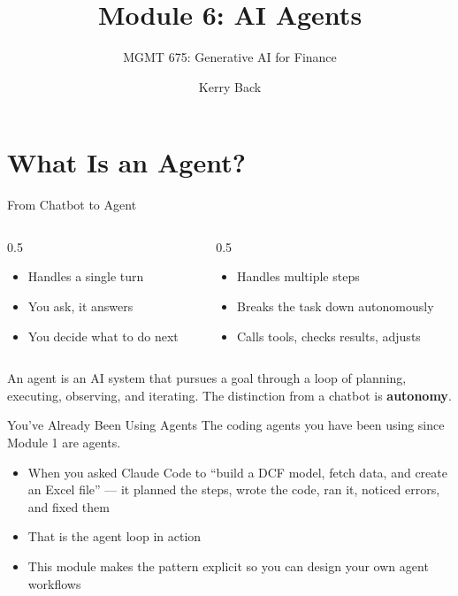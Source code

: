 \documentclass[aspectratio=169]{beamer}
\subtitle{MGMT 675: Generative AI for Finance}
\title{Module 6: AI Agents}
\author{Kerry Back}
\date{}
\begin{document}
\maketitle

\section{What Is an Agent?}

\begin{frame}{From Chatbot to Agent}
\begin{columns}[T]
\begin{column}{0.5\textwidth}
\begin{shadedbox}[title=\textbf{Chatbot}]
\begin{itemize}\small
  \item Handles a single turn
  \item You ask, it answers
  \item \alert{You} decide what to do next
\end{itemize}
\end{shadedbox}
\end{column}
\begin{column}{0.5\textwidth}
\begin{shadedbox}[title=\textbf{Agent}]
\begin{itemize}\small
  \item Handles multiple steps
  \item Breaks the task down autonomously
  \item Calls tools, checks results, adjusts
\end{itemize}
\end{shadedbox}
\end{column}
\end{columns}
\vspace{0.3cm}
An \alert{agent} is an AI system that pursues a goal through a loop of planning, executing, observing, and iterating.  The distinction from a chatbot is \textbf{autonomy}.
\end{frame}

\begin{frame}{You've Already Been Using Agents}
The coding agents you have been using since Module 1 are agents.
\vspace{0.3cm}
\begin{itemize}
  \item When you asked Claude Code to ``build a DCF model, fetch data, and create an Excel file'' --- it planned the steps, wrote the code, ran it, noticed errors, and fixed them
  \item That is the agent loop in action
  \item This module makes the pattern explicit so you can design your own agent workflows
\end{itemize}
\end{frame}
\end{document}
